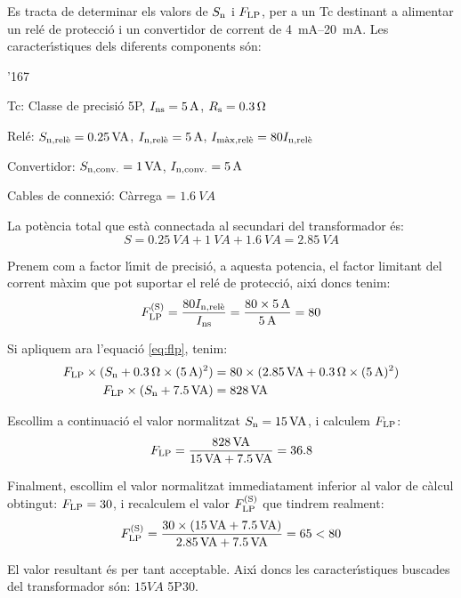 \begin{exemple}
    Es tracta de determinar els valors de $S_\mathrm{n}$ i $F_\mathrm{LP}$,  per
    a un Tc destinant a alimentar  un rel\'{e} de protecci\'{o} i un convertidor
    de corrent de \SIrange{4}{20}{mA}. Les caracter\'{\i}stiques
    dels diferents components s\'{o}n:
    \begin{dinglist}{'167}
        \item Tc: Classe de precisi\'{o}  5P, $I_\mathrm{ns}=5\mathrm{\,A}$,
        $R_\mathrm{s}=\SI{0,3}{\ensuremath{\mathrm{\Omega}}}$
        \item Rel\'{e}: $S_\mathrm{n,rel\grave{e}}=\SI{0,25}{VA}$,
        $I_\mathrm{n,rel\grave{e}}=5\mathrm{\,A}$, $I_\mathrm{m\grave{a}x,rel\grave{e}}=
        80 I_\mathrm{n,rel\grave{e}}$
        \item Convertidor: $S_\mathrm{n,conv.}=1\mathrm{\,VA}$,
        $I_\mathrm{n,conv.}=5\mathrm{\,A}$
        \item Cables de connexi\'{o}: C\`{a}rrega = $\SI{1,6}{VA}$
    \end{dinglist}

    La pot\`{e}ncia total que est\`{a} connectada al secundari del transformador
    \'{e}s:
    \[
        S = \SI{0,25}{VA} + \SI{1}{VA} + \SI{1,6}{VA} = \SI{2,85}{VA}
    \]

    Prenem com a factor l\'{\i}mit de precisi\'{o},  a aquesta potencia, el
    factor limitant del corrent m\`{a}xim que pot suportar el rel\'{e} de
    protecci\'{o}, aix\'{\i} doncs tenim:
    \[
        F_\mathrm{LP}^\mathrm{(S)} = \frac{80 I_\mathrm{n,rel\grave{e}}}{I_\mathrm{ns}} =
        \frac{80\times 5\mathrm{\,A}}{5\mathrm{\,A}} = 80
    \]

    Si apliquem ara l'equaci\'{o} \eqref{eq:flp}, tenim:
    \begin{align*}
        F_\mathrm{LP}\times(S_\mathrm{n}+\SI{0,3}{\ensuremath{\mathrm{\Omega}}} \times (5\mathrm{\,A})^2) &=
        80\times(\SI{2,85}{VA}+\SI{0,3}{\ensuremath{\mathrm{\Omega}}} \times (5\mathrm{\,A})^2) \\
        F_\mathrm{LP}\times(S_\mathrm{n}+\SI{7,5}{VA}) &= 828\mathrm{\,VA}
    \end{align*}

    Escollim a continuaci\'{o} el valor normalitzat $S_\mathrm{n}=
    15\mathrm{\,VA}$, i calculem $F_\mathrm{LP}$:
    \[
        F_\mathrm{LP} = \frac{828\mathrm{\,VA}}{15\mathrm{\,VA}+\SI{7,5}{VA}}
        = \num{36,8}
    \]

    Finalment, escollim el valor normalitzat immediatament inferior al valor
    de c\`{a}lcul obtingut: $F_\mathrm{LP} = 30$, i
    recalculem el valor $F_\mathrm{LP}^\mathrm{(S)}$ que tindrem realment:
    \[
    F_\mathrm{LP}^\mathrm{(S)} = \frac{30\times(15\mathrm{\,VA} + \SI{7,5}{VA})}
    {\SI{2,85}{VA} + \SI{7,5}{VA}} = 65 < 80
    \]

    El valor resultant \'{e}s per tant acceptable. Aix\'{\i} doncs les
    caracter\'{\i}stiques buscades del transformador s\'{o}n: $15\unit{VA}$ 5P30.
\end{exemple}


